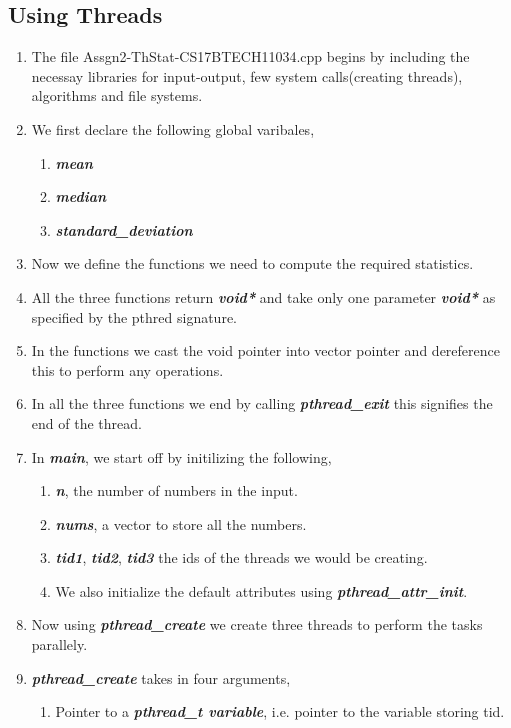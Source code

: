 \documentclass[a4paper,12pt]{report}
\begin{document}
\subsection*{Using Threads}
\begin{enumerate}
\item The file Assgn2-ThStat-CS17BTECH11034.cpp begins by including the
necessay libraries for input-output, few system calls(creating threads), algorithms and file systems.
\item We first declare the following global varibales,
\begin{enumerate}
\item \textit{\textbf{mean}}
\item \textit{\textbf{median}}
\item \textit{\textbf{standard\_deviation}}
\end{enumerate}
\item Now we define the functions we need to compute the required statistics.
\item All the three functions return \textit{\textbf{void*}} and take only one parameter \textbf{\textit{void*}} as specified by the pthred signature.
\item In the functions we cast the void pointer into vector pointer and dereference this to perform any operations.
\item In all the three functions we end by calling \textit{\textbf{pthread\_exit}} this signifies the end of the thread.
\item In \textit{\textbf{main}}, we start off by initilizing the following,
\begin{enumerate}
\item \textit{\textbf{n}}, the number of numbers in the input.
\item \textit{\textbf{nums}}, a vector to store all the numbers.
\item \textbf{\textit{tid1}}, \textbf{\textit{tid2}}, \textbf{\textit{tid3}} the ids of the threads we would be creating.
\item We also initialize the default attributes using \textit{\textbf{pthread\_attr\_init}}.
\end{enumerate}
\item Now using \textbf{\textit{pthread\_create}} we create three threads to perform the tasks parallely.
\item  \textit{\textbf{pthread\_create}} takes in four arguments,
\begin{enumerate}
\item Pointer to a \textit{\textbf{pthread\_t variable}}, i.e. pointer to the variable storing tid.

\end{enumerate}
\end{enumerate}
\end{document}
